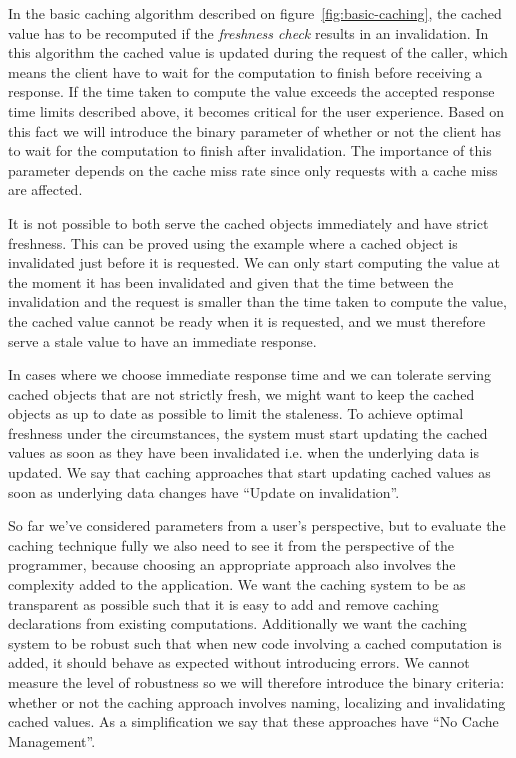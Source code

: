 In the basic caching algorithm described on figure~\ref{fig:basic-caching}, the cached value has to be recomputed if the \emph{freshness check} results in an invalidation. In this algorithm the cached value is updated during the request of the caller, which means the client have to wait for the computation to finish before receiving a response. If the time taken to compute the value exceeds the accepted response time limits described above, it becomes critical for the user experience. Based on this fact we will introduce the binary parameter of whether or not the client has to wait for the computation to finish after invalidation. The importance of this parameter depends on the cache miss rate since only requests with a cache miss are affected.


It is not possible to both serve the cached objects immediately and have strict freshness. This can be proved using the example where a cached object is invalidated just before it is requested. We can only start computing the value at the moment it has been invalidated and given that the time between the invalidation and the request is smaller than the time taken to compute the value, the cached value cannot be ready when it is requested, and we must therefore serve a stale value to have an immediate response.

In cases where we choose immediate response time and we can tolerate serving cached objects that are not strictly fresh, we might want to keep the cached objects as up to date as possible to limit the staleness. To achieve optimal freshness under the circumstances, the system must start updating the cached values as soon as they have been invalidated i.e. when the underlying data is updated. We say that caching approaches that start updating cached values as soon as underlying data changes have ``Update on invalidation''.


So far we've considered parameters from a user's perspective, but to evaluate the caching technique fully we also need to see it from the perspective of the programmer, because choosing an appropriate approach also involves the complexity added to the application. We want the caching system to be as transparent as possible such that it is easy to add and remove caching  declarations from existing computations. Additionally we want the caching system to be robust such that when new code involving a cached computation is added, it should behave as expected without introducing errors. We cannot measure the level of robustness so we will therefore introduce the binary criteria: whether or not the caching approach involves naming, localizing and invalidating cached values. As a simplification we say that these approaches have ``No Cache Management''.

